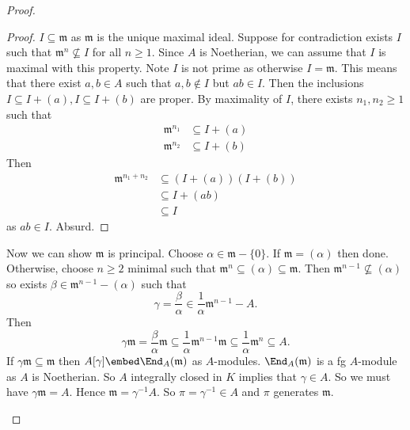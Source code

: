 \documentclass[a4paper]{article}
\theoremstyle{definition}
\begin{document}
\begin{proof}
\begin{itemize}
    \begin{proof}
      \(I \subseteq \mathfrak m\) as \(\mathfrak m\) is the unique maximal ideal. Suppose for contradiction exists \(I\) such that \(\mathfrak m^n \nsubseteq I\) for all \(n \geq 1\). Since \(A\) is Noetherian, we can assume that \(I\) is maximal with this property. Note \(I\) is not prime as otherwise \(I = \mathfrak m\). This means that there exist \(a, b \in A\) such that \(a, b \notin I\) but \(ab \in I\). Then the inclusions \(I \subseteq I + (a), I \subseteq I + (b)\) are proper. By maximality of \(I\), there exists \(n_1, n_2 \geq 1\) such that
      \begin{align*}
        \mathfrak m^{n_1} &\subseteq I + (a) \\
        \mathfrak m^{n_2} &\subseteq I + (b)
      \end{align*}
      Then
      \begin{align*}
        \mathfrak m^{n_1 + n_2} &\subseteq (I + (a)) (I + (b)) \\
                                &\subseteq I + (ab) \\
                                &\subseteq I
      \end{align*}
      as \(ab \in I\). Absurd.
    \end{proof}
    Now we can show \(\mathfrak m\) is principal. Choose \(\alpha \in \mathfrak m - \{0\}\). If \(\mathfrak m = (\alpha)\) then done. Otherwise, choose \(n \geq 2\) minimal such that \(\mathfrak m^n \subseteq (\alpha) \subseteq \mathfrak m\). Then \(\mathfrak m^{n - 1} \nsubseteq (\alpha)\) so exists \(\beta \in \mathfrak m^{n - 1} - (\alpha)\) such that
    \[
      \gamma = \frac{\beta}{\alpha} \in \frac{1}{\alpha} \mathfrak m^{n - 1} - A.
    \]
    Then
    \[
      \gamma \mathfrak m = \frac{\beta}{\alpha} \mathfrak m \subseteq \frac{1}{\alpha} \mathfrak m^{n - 1} \mathfrak m \subseteq \frac{1}{\alpha} \mathfrak m^n \subseteq A.
    \]
    If \(\gamma \mathfrak m \subseteq \mathfrak m\) then \(A[\gamma] \embed \End_A(\mathfrak m)\) as \(A\)-modules. \(\End_A(\mathfrak m)\) is a fg \(A\)-module as \(A\) is Noetherian. So \(A\) integrally closed in \(K\) implies that \(\gamma \in A\). So we must have \(\gamma \mathfrak m = A\). Hence \(\mathfrak m = \gamma^{-1} A\). So \(\pi = \gamma^{-1} \in A\) and \(\pi\) generates \(\mathfrak m\).
  \end{itemize}
\end{proof}


\printindex
\end{document}
